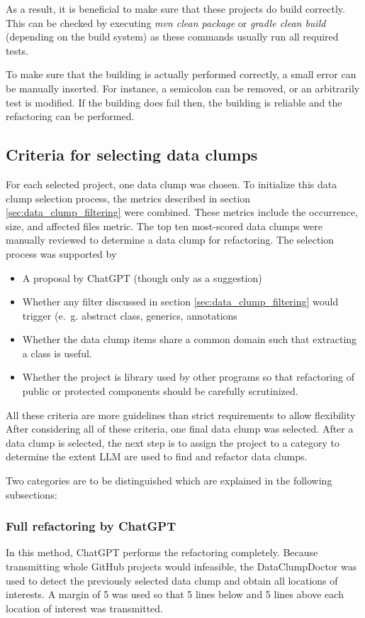 As a result, it is beneficial to make sure that these projects do build correctly. This can be checked by executing \textit{mvn clean package} or \textit{gradle clean build} (depending on the build system) as these commands usually run all required tests.

To make sure that the building is actually performed correctly, a small error can be manually inserted. For instance, a semicolon can be removed, or an arbitrarily test is modified. If the building does fail then, the building is reliable and the refactoring can be performed. 

\subsection{Criteria for selecting data clumps}
For each selected project, one data clump was chosen. To initialize this data clump selection process, the metrics described in section \ref{sec:data_clump_filtering} were combined. These metrics include the occurrence, size, and affected files metric. The top ten most-scored data clumps were manually reviewed to determine a data clump for refactoring. The selection process was supported by 
\begin{itemize}
\item A proposal by ChatGPT (though only as a suggestion)
    \item Whether any filter discussed in section \ref{sec:data_clump_filtering} would trigger (e.~g. abstract class, generics, annotations
    \item Whether the data clump items share a common domain such that extracting a class is useful. 
    \item Whether the project is library used by other programs so that refactoring of public or protected components should be carefully scrutinized. 
\end{itemize}

All these criteria are more guidelines than strict requirements to allow flexibility 
After considering all of these criteria, one final data clump was selected.
After a data clump is selected, the next step is to assign the project to a category to determine the extent \acs{LLM} are used to find and refactor data clumps. 

Two categories are to be distinguished which are explained in the following subsections:

\subsubsection{Full refactoring by ChatGPT}
In this method, ChatGPT performs the refactoring completely. Because transmitting whole GitHub projects would infeasible, the DataClumpDoctor was used to detect the previously selected data clump and obtain all locations of interests. A margin of 5 was used so that 5 lines below and 5 lines above each location of interest was transmitted. 

